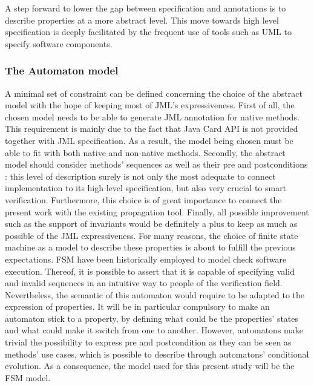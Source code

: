 A step forward to lower the gap between specification and annotations is to describe properties at a more abstract level. This move towards high level specification is deeply facilitated by the frequent use of tools such as UML to specify software components.

\subsubsection{The Automaton model}
A minimal set of constraint can be defined concerning the choice of the abstract model with the hope of keeping most of JML's expressiveness. First of all, the chosen model needs to be able to generate JML annotation for native methods. This requirement is mainly due to the fact that Java Card API is not provided together with JML specification. As a result, the model being chosen must be able to fit with both native and non-native methods. Secondly, the abstract model should consider methods' sequences as well as their pre and postconditions : this level of description surely is not only the most adequate to connect implementation to its high level specification, but also very crucial to smart verification. Furthermore, this choice is of great importance to connect the present work with the existing propagation tool. Finally, all possible improvement such as the support of invariants would be definitely a plus to keep as much as possible of the JML expressiveness.
For many reasons, the choice of finite state machine as a model to describe these properties is about to fulfill the previous expectations. FSM have been historically employed to model check software execution. Thereof, it is possible to assert that it is capable of specifying valid and invalid sequences in an intuitive way to people of the verification field. Nevertheless, the semantic of this automaton would require to be adapted to the expression of properties. It will be in particular compulsory to make an automaton stick to a property, by defining what could be the properties' states and what could make it switch from one to another. However, automatons make trivial the possibility to express pre and postcondition as they can be seen as methods' use cases, which is possible to describe through automatons' conditional evolution. As a consequence, the model used for this present study will be the FSM model.

